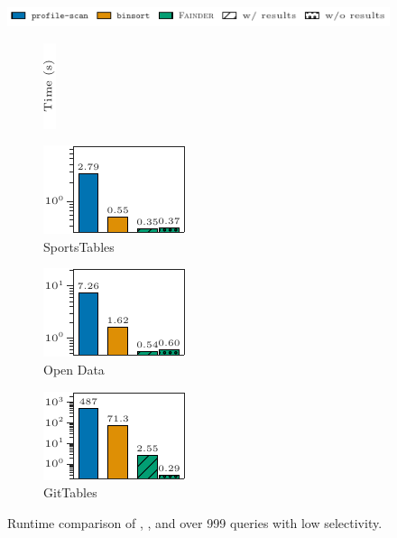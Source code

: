 \begin{figure}[t]
    \centering
    \includegraphics{figures/figure_11_legend.pdf}\\
    \begin{subfigure}[t]{.03\linewidth}
        \centering
        \includegraphics{figures/figure_11_label.pdf}
    \end{subfigure}%
    \hspace{-0.005\linewidth}%
    \begin{subfigure}[t]{.325\linewidth}
        \centering
        \includegraphics{figures/figure_11_a.pdf}
        \caption{SportsTables}
    \end{subfigure}%
    \begin{subfigure}[t]{.325\linewidth}
        \centering
        \includegraphics{figures/figure_11_b.pdf}
        \caption{Open Data}
    \end{subfigure}%
    \begin{subfigure}[t]{.325\linewidth}
        \centering
        \includegraphics{figures/figure_11_c.pdf}
        \caption{GitTables}
    \end{subfigure}%
    \caption{Runtime comparison of \pscan, \binsort, and \approximate{} over 999 queries with low selectivity.}
    \label{fig:runtime_comparison_low_selectivity}
\end{figure}

